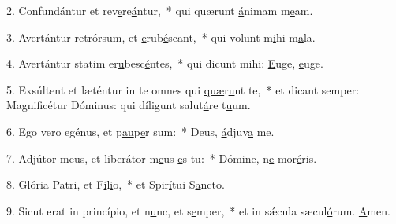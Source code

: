 2. Confundántur et rev\uline{e}re\uline{á}ntur,~* qui quærunt \uline{á}nimam m\uline{e}am.\par 
3. Avertántur retrórsum, et \uline{e}rub\uline{é}scant,~* qui volunt m\uline{i}hi m\uline{a}la.\par 
4. Avertántur statim er\uline{u}besc\uline{é}ntes,~* qui dicunt mihi: \uline{E}uge, \uline{e}uge.\par 
5. Exsúltent et læténtur in te omnes qui \uline{quæ}r\uline{u}nt te,~* et dicant semper: Magnificétur Dóminus: qui díligunt salut\uline{á}re t\uline{u}um.\par 
6. Ego vero egénus, et p\uline{au}p\uline{e}r sum:~* Deus, \uline{á}djuv\uline{a} me.\par 
7. Adjútor meus, et liberátor m\uline{e}us \uline{e}s tu:~* Dómine, n\uline{e} mor\uline{é}ris.\par 
8. Glória Patri, et F\uline{í}l\uline{i}o,~* et Spir\uline{í}tui S\uline{a}ncto.\par 
9. Sicut erat in princípio, et n\uline{u}nc, et s\uline{e}mper,~* et in sǽcula sæcul\uline{ó}rum. \uline{A}men.\par 
